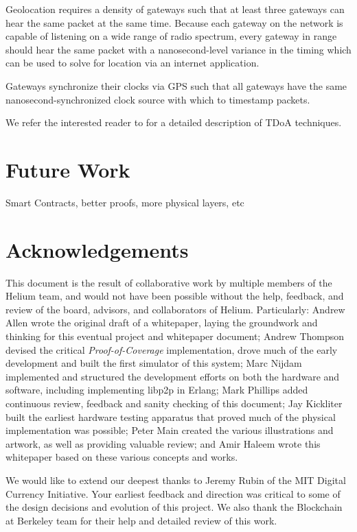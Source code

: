 \documentclass[letterpaper,11pt]{article}
\begin{document}
Geolocation requires a density of gateways such that at least three gateways can hear the same packet at the same time. Because each gateway on the network is capable of listening on a wide range of radio spectrum, every gateway in range should hear the same packet with a nanosecond-level variance in the timing which can be used to solve for location via an internet application.

Gateways synchronize their clocks via GPS such that all gateways have the same nanosecond-synchronized clock source with which to timestamp packets.

We refer the interested reader to\cite{tdoa} for a detailed description of TDoA techniques.

\newpage

\section{Future Work}

Smart Contracts, better proofs, more physical layers, etc

\newpage

\section{Acknowledgements}

This document is the result of collaborative work by multiple members of the Helium team, and would not have been possible without the help, feedback, and review of the board, advisors, and collaborators of Helium. Particularly: Andrew Allen wrote the original draft of a whitepaper, laying the groundwork and thinking for this eventual project and whitepaper document; Andrew Thompson devised the critical \emph{Proof-of-Coverage} implementation, drove much of the early development and built the first simulator of this system; Marc Nijdam implemented and structured the development efforts on both the hardware and software, including implementing libp2p in Erlang; Mark Phillips added continuous review, feedback and sanity checking of this document; Jay Kickliter built the earliest hardware testing apparatus that proved much of the physical implementation was possible; Peter Main created the various illustrations and artwork, as well as providing valuable review; and Amir Haleem wrote this whitepaper based on these various concepts and works.

We would like to extend our deepest thanks to Jeremy Rubin of the MIT Digital Currency Initiative. Your earliest feedback and direction was critical to some of the design decisions and evolution of this project. We also thank the Blockchain at Berkeley team for their help and detailed review of this work.
\end{document}
